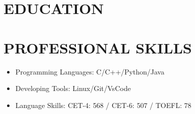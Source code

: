 \documentclass[10pt,a4paper,sans]{moderncv} %
\begin{document}
\makecvtitle %



\section{EDUCATION}




\section{PROFESSIONAL SKILLS}
\begin{itemize}
\setlength{\itemindent}{2em}
   \item Programming Languages: C/C++/Python/Java
  	\item Developing Tools: Linux/Git/VsCode
  	\item Language Skills: CET-4: 568 / CET-6: 507 / TOEFL: 78
\end{itemize}

\end{document}
